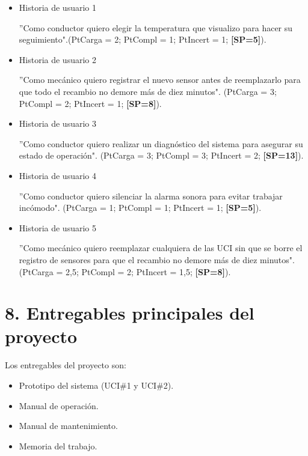 \documentclass[
11pt, %
codirector, %
]{charter}
\begin{document}
\begin{itemize}

\item Historia de usuario 1

''Como conductor quiero elegir la temperatura que visualizo para hacer su seguimiento".\newline (PtCarga = 2; PtCompl = 1; PtIncert = 1; \textbf{[SP=5]}).


\item Historia de usuario 2

''Como mecánico quiero registrar el nuevo sensor antes de reemplazarlo para que todo el recambio no demore más de diez minutos". \newline (PtCarga = 3; PtCompl = 2; PtIncert = 1; \textbf{[SP=8]}).

\item Historia de usuario 3

''Como conductor quiero realizar un diagnóstico del sistema para asegurar su estado de operación". \newline (PtCarga = 3; PtCompl = 3; PtIncert = 2; \textbf{[SP=13]}).

\item Historia de usuario 4

''Como conductor quiero silenciar la alarma sonora para evitar trabajar incómodo". \newline (PtCarga = 1; PtCompl = 1; PtIncert = 1; \textbf{[SP=5]}).

\item Historia de usuario 5

''Como mecánico quiero reemplazar cualquiera de las UCI sin que se borre el registro de sensores para que el recambio no demore más de diez minutos". \newline (PtCarga = 2,5; PtCompl = 2; PtIncert = 1,5; \textbf{[SP=8]}).

\end{itemize}

\section{8. Entregables principales del proyecto}
\label{sec:entregables}

Los entregables del proyecto son:

\begin{itemize}
	\item Prototipo del sistema (UCI\#1 y UCI\#2).
	\item Manual de operación.
	\item Manual de mantenimiento.
	\item Memoria del trabajo.
\end{itemize}
\end{document}
